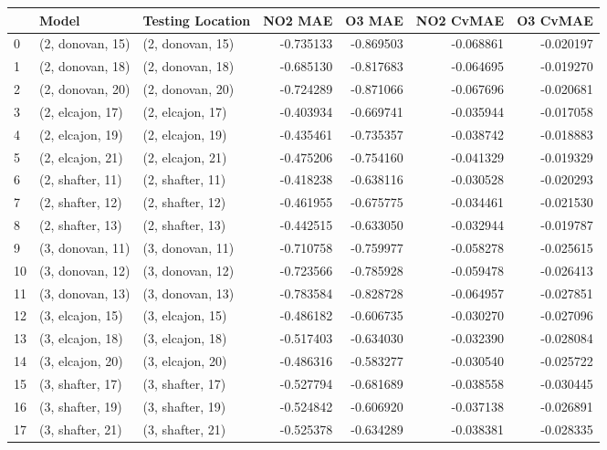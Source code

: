 \begin{tabular}{lllrrrr}
\toprule
{} &             Model &  Testing Location &   NO2 MAE &    O3 MAE &  NO2 CvMAE &  O3 CvMAE \\
\midrule
0  &  (2, donovan, 15) &  (2, donovan, 15) & -0.735133 & -0.869503 &  -0.068861 & -0.020197 \\
1  &  (2, donovan, 18) &  (2, donovan, 18) & -0.685130 & -0.817683 &  -0.064695 & -0.019270 \\
2  &  (2, donovan, 20) &  (2, donovan, 20) & -0.724289 & -0.871066 &  -0.067696 & -0.020681 \\
3  &  (2, elcajon, 17) &  (2, elcajon, 17) & -0.403934 & -0.669741 &  -0.035944 & -0.017058 \\
4  &  (2, elcajon, 19) &  (2, elcajon, 19) & -0.435461 & -0.735357 &  -0.038742 & -0.018883 \\
5  &  (2, elcajon, 21) &  (2, elcajon, 21) & -0.475206 & -0.754160 &  -0.041329 & -0.019329 \\
6  &  (2, shafter, 11) &  (2, shafter, 11) & -0.418238 & -0.638116 &  -0.030528 & -0.020293 \\
7  &  (2, shafter, 12) &  (2, shafter, 12) & -0.461955 & -0.675775 &  -0.034461 & -0.021530 \\
8  &  (2, shafter, 13) &  (2, shafter, 13) & -0.442515 & -0.633050 &  -0.032944 & -0.019787 \\
9  &  (3, donovan, 11) &  (3, donovan, 11) & -0.710758 & -0.759977 &  -0.058278 & -0.025615 \\
10 &  (3, donovan, 12) &  (3, donovan, 12) & -0.723566 & -0.785928 &  -0.059478 & -0.026413 \\
11 &  (3, donovan, 13) &  (3, donovan, 13) & -0.783584 & -0.828728 &  -0.064957 & -0.027851 \\
12 &  (3, elcajon, 15) &  (3, elcajon, 15) & -0.486182 & -0.606735 &  -0.030270 & -0.027096 \\
13 &  (3, elcajon, 18) &  (3, elcajon, 18) & -0.517403 & -0.634030 &  -0.032390 & -0.028084 \\
14 &  (3, elcajon, 20) &  (3, elcajon, 20) & -0.486316 & -0.583277 &  -0.030540 & -0.025722 \\
15 &  (3, shafter, 17) &  (3, shafter, 17) & -0.527794 & -0.681689 &  -0.038558 & -0.030445 \\
16 &  (3, shafter, 19) &  (3, shafter, 19) & -0.524842 & -0.606920 &  -0.037138 & -0.026891 \\
17 &  (3, shafter, 21) &  (3, shafter, 21) & -0.525378 & -0.634289 &  -0.038381 & -0.028335 \\

\end{tabular}
